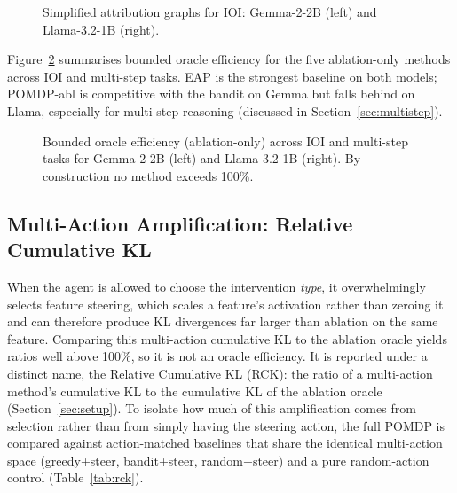 \begin{figure}[H]
\centering
\resizebox{0.92\linewidth}{!}{%
%
}
\caption{Simplified attribution graphs for IOI: Gemma-2-2B (left) and Llama-3.2-1B (right).}
\label{fig:attribution_graph}
\end{figure}

Figure~\ref{fig:oracle_eff} summarises bounded oracle efficiency for
the five ablation-only methods across IOI and multi-step tasks.  EAP
is the strongest baseline on both models; POMDP-abl is competitive
with the bandit on Gemma but falls behind on Llama, especially for
multi-step reasoning (discussed in Section~\ref{sec:multistep}).

\begin{figure}[H]
\centering

\caption{Bounded oracle efficiency (ablation-only) across IOI and
multi-step tasks for Gemma-2-2B (left) and Llama-3.2-1B (right).
By construction no method exceeds 100\%.}
\label{fig:oracle_eff}
\end{figure}

\subsection{Multi-Action Amplification: Relative Cumulative KL}
\label{sec:rck}

When the agent is allowed to choose the intervention \emph{type}, it
overwhelmingly selects feature steering, which scales a feature's
activation rather than zeroing it and can therefore produce KL
divergences far larger than ablation on the same feature.  Comparing
this multi-action cumulative KL to the ablation oracle yields
ratios well above 100\%, so it is not an oracle efficiency.  It is
reported under a distinct name, the Relative Cumulative KL
(RCK): the ratio of a multi-action method's cumulative KL to the
cumulative KL of the ablation oracle (Section~\ref{sec:setup}).  To
isolate how much of this amplification comes from selection
rather than from simply having the steering action, the full
POMDP is compared against action-matched baselines that share the identical
multi-action space (greedy+steer, bandit+steer, random+steer) and a
pure random-action control (Table~\ref{tab:rck}).

